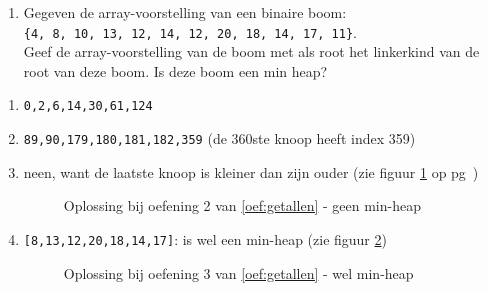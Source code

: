 \begin{oef}
\begin{enumerate}
\item Gegeven de array-voorstelling van een binaire boom: \\ \verb+{4, 8, 10, 13, 12, 14, 12, 20, 18, 14, 17, 11}+.  \\
Geef de array-voorstelling van de boom met als root het linkerkind van de root van deze  boom. Is deze boom een min heap?
\end{enumerate}
\begin{opl}
\begin{enumerate}
\item \verb/0,2,6,14,30,61,124/
\item \verb/89,90,179,180,181,182,359/ (de 360ste knoop heeft index 359)
\item neen, want de laatste knoop is kleiner dan zijn ouder  (zie figuur \ref{fig:geenMinHeap} op pg~\pageref{fig:geenMinHeap}) 
\begin{figure}[htbp]
    \centering
{}
\caption{Oplossing bij oefening 2 van \ref{oef:getallen} - geen min-heap}
\label{fig:geenMinHeap}
\end{figure}
\item \verb/[8,13,12,20,18,14,17]/: is wel een min-heap (zie figuur \ref{fig:welMinHeap})
\begin{figure}[htbp]
    \centering
{}
\caption{Oplossing bij oefening 3 van \ref{oef:getallen} - wel min-heap}
\label{fig:welMinHeap}
\end{figure}
\end{enumerate}
\end{opl}
\end{oef}
